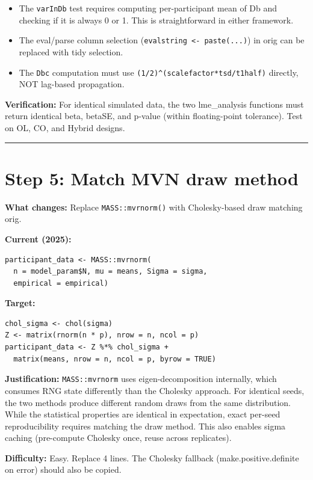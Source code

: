 \documentclass[11pt]{article}
\begin{document}
\begin{itemize}
  \item The \texttt{varInDb} test requires computing per-participant mean of Db
    and checking if it is always 0 or 1. This is straightforward in
    either framework.
  \item The eval/parse column selection (\texttt{evalstring <- paste(...)}) in
    orig can be replaced with tidy selection.
  \item The \texttt{Dbc} computation must use \texttt{(1/2)\^{}(scalefactor*tsd/t1half)}
    directly, NOT lag-based propagation.
\end{itemize}

\textbf{Verification:} For identical simulated data, the two
lme\_analysis functions must return identical beta, betaSE, and
p-value (within floating-point tolerance). Test on OL, CO, and
Hybrid designs.

\bigskip\noindent\rule{\textwidth}{0.4pt}\bigskip

\section{Step 5: Match MVN draw method}

\textbf{What changes:} Replace \texttt{MASS::mvrnorm()} with Cholesky-based
draw matching orig.

\textbf{Current (2025):}
\begin{lstlisting}
participant_data <- MASS::mvrnorm(
  n = model_param$N, mu = means, Sigma = sigma,
  empirical = empirical)
\end{lstlisting}

\textbf{Target:}
\begin{lstlisting}
chol_sigma <- chol(sigma)
Z <- matrix(rnorm(n * p), nrow = n, ncol = p)
participant_data <- Z %*% chol_sigma +
  matrix(means, nrow = n, ncol = p, byrow = TRUE)
\end{lstlisting}

\textbf{Justification:} \texttt{MASS::mvrnorm} uses eigen-decomposition
internally, which consumes RNG state differently than the Cholesky
approach. For identical seeds, the two methods produce different
random draws from the same distribution. While the statistical
properties are identical in expectation, exact per-seed
reproducibility requires matching the draw method. This also
enables sigma caching (pre-compute Cholesky once, reuse across
replicates).

\textbf{Difficulty:} Easy. Replace 4 lines. The Cholesky fallback
(make.positive.definite on error) should also be copied.
\end{document}
